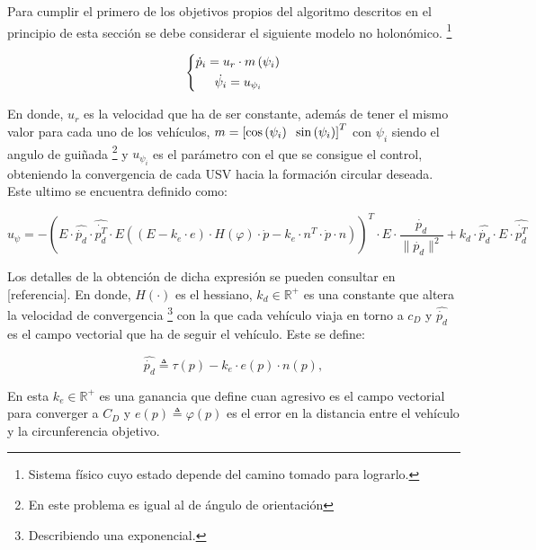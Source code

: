 Para cumplir el primero de los objetivos propios del algoritmo descritos en el principio de esta sección se debe considerar el siguiente modelo no holonómico. \footnote[3]{Sistema físico cuyo estado depende del camino tomado para lograrlo.}

\begin{equation}
	 \left \{
    \begin{aligned}
\dot{p}_{i}=u_{r}\cdot{m\left(\psi_{i}\right)}\\
\dot{\psi_{i}}=u_{\psi_{i}}\hspace{5mm}\\
    \end{aligned}
  \right.
\end{equation}

En donde, $u_{r}$ es la velocidad que ha de ser constante, además de tener el mismo valor para cada uno de los vehículos, $m=\left[\cos\left(\psi_{i}\right)\hspace{2mm}\sin\left(\psi_{i}\right)\right]^{T}$ con $\psi_{i}$ siendo el angulo de guiñada \footnote[4]{En este problema es igual al de ángulo de orientación} y $u_{\psi_{i}}$ es el parámetro con el que se consigue el control, obteniendo la convergencia de cada USV hacia la formación circular deseada. Este ultimo se encuentra definido como:

\begin{equation} \label{Action_Control}
	u_{\psi}=-\left(E\cdot\hat{\dot{p_d}}\cdot{\hat{\dot{p_{d}^{T}}}}\cdot{E}\left(\left(E-k_{e}\cdot{e}\right)\cdot{H\left(\varphi\right)}\cdot{\dot{p}}-k_{e}\cdot{n^T}\cdot{\dot{p}}\cdot{n}\right)\right)^{T}\cdot{E}\cdot{\frac{\dot{p_d}}{\|\dot{p_{d}}\|^{2}}}+k_{d}\cdot{\hat{\dot{p_{d}}}}\cdot{E}\cdot{\hat{\dot{p_{d}^{T}}}}
\end{equation}

Los detalles de la obtención de dicha expresión se pueden consultar en [referencia]. En donde, $H\left(\cdot\right)$ es el hessiano, $k_{d}\in\mathbb{R}^{+}$ es una constante que altera la velocidad de convergencia \footnote[5]{Describiendo una exponencial.} con la que cada vehículo viaja en torno a $c_D$ y $\hat{\dot{p_{d}}}$ es el campo vectorial que ha de seguir el vehículo. Este se define:

\begin{equation} \label{Control_for}
	\hat{\dot{p_{d}}}\triangleq\tau\left(p\right)-k_{e}\cdot{e\left(p\right)}\cdot{n\left(p\right)},
\end{equation}

En esta $k_{e}\in\mathbb{R}^{+}$ es una ganancia que define cuan agresivo es el campo vectorial para converger a $C_D$ y $e\left(p\right)\triangleq\varphi\left(p\right)$ es el error en la distancia entre el vehículo y la circunferencia objetivo. 

